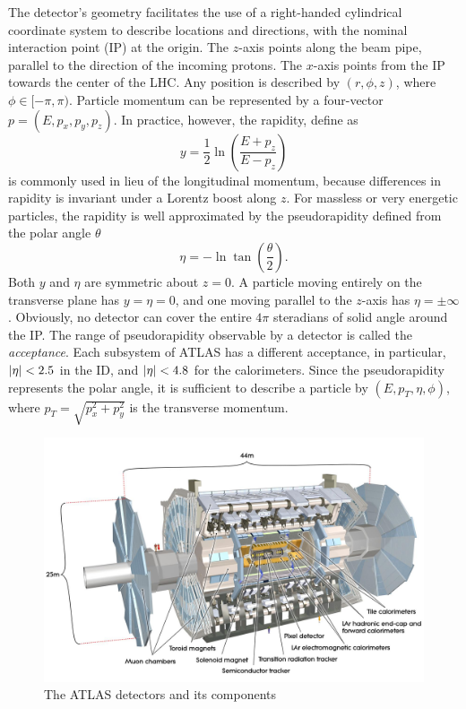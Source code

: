 The detector's geometry facilitates the use of a right-handed cylindrical coordinate system to describe locations and directions, with the nominal interaction point (IP) at the origin. The $z$-axis points along the beam pipe, parallel to the direction of the incoming protons. The $x$-axis points from the IP towards the center of the LHC. Any position is described by $(r, \phi, z)$, where $\phi \in [-\pi, \pi)$. Particle momentum can be represented by a four-vector $p=(E, p_x, p_y, p_z)$. In practice, however, the rapidity, define as 
\begin{equation}
    \label{eq:3.1}
    y = \frac{1}{2}\ln\left( \frac{E+p_z}{E-p_z} \right)
\end{equation}
is commonly used in lieu of the longitudinal momentum, because differences in rapidity is invariant under a Lorentz boost along $z$. For massless or very energetic particles, the rapidity is well approximated by the pseudorapidity defined from the polar angle $\theta$
\begin{equation}
    \label{eq:3.2}
    \eta = -\ln \tan \left ( \frac{\theta}{2} \right).
\end{equation}
Both $y$ and $\eta$ are symmetric about $z=0$. A particle moving entirely on the transverse plane has $y=\eta=0$, and one moving parallel to the $z$-axis has $\eta=\pm\infty$. Obviously, no detector can cover the entire $4\pi$ steradians of solid angle around the IP. The range of pseudorapidity observable by a detector is called the \textit{acceptance}. Each subsystem of ATLAS has a different acceptance, in particular, $\abs{\eta}<2.5$ in the ID, and $\abs{\eta}<4.8$ for the calorimeters. Since the pseudorapidity represents the polar angle, it is sufficient to describe a particle by $(E, p_T, \eta, \phi)$, where $p_T = \sqrt{p_x^2 + p_y^2}$ is the transverse momentum.

\begin{figure}[h!]
    \centering
    \includegraphics[width=0.9\linewidth]{figures/atlas.jpg}
    \caption{The ATLAS detectors and its components \cite{Pequenao:1095924}}
    \label{fig:atlas-schematic}
\end{figure}

